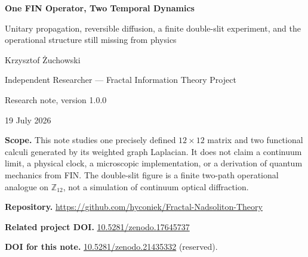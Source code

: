 \documentclass[11pt,a4paper]{article}
\theoremstyle{definition}
\theoremstyle{remark}
\newcommand{\Z}{\mathbb Z}
\begin{document}
\hypersetup{pageanchor=false}

\begin{titlepage}
\centering
\vspace*{18mm}
{\Huge\bfseries One FIN Operator, Two Temporal Dynamics\par}
\vspace{5mm}
{\Large Unitary propagation, reversible diffusion, a finite double-slit experiment, and the operational structure still missing from physics\par}
\vspace{15mm}
{\Large Krzysztof Żuchowski\par}
\vspace{2mm}
{\normalsize Independent Researcher --- Fractal Information Theory Project\par}
\vspace{10mm}
{\large Research note, version 1.0.0\par}
{\large 19 July 2026\par}
\vfill
\begin{minipage}{0.88\textwidth}
\small
\textbf{Scope.} This note studies one precisely defined $12\times12$ matrix and two functional calculi generated by its weighted graph Laplacian. It does not claim a continuum limit, a physical clock, a microscopic implementation, or a derivation of quantum mechanics from FIN. The double-slit figure is a finite two-path operational analogue on $\Z_{12}$, not a simulation of continuum optical diffraction.

\medskip
\textbf{Repository.} \url{https://github.com/hyconiek/Fractal-Nadsoliton-Theory}

\textbf{Related project DOI.} \href{https://doi.org/10.5281/zenodo.17645737}{10.5281/zenodo.17645737}

\textbf{DOI for this note.} \href{https://doi.org/10.5281/zenodo.21435332}{10.5281/zenodo.21435332} (reserved).
\end{minipage}
\vfill
\end{titlepage}
\hypersetup{pageanchor=true}
\end{document}
